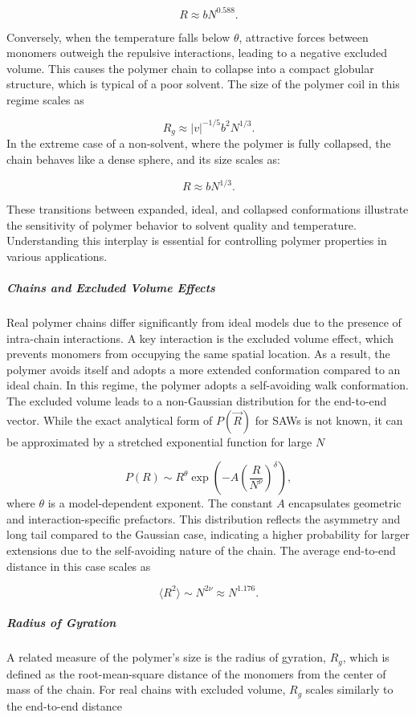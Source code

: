 \documentclass{article}      %
\begin{document}
\[
R \approx b N^{0.588}.
\]

Conversely, when the temperature falls below \( \theta \), attractive forces between monomers outweigh the repulsive interactions, leading to a negative excluded volume. This causes the polymer chain to collapse into a compact globular structure, which is typical of a poor solvent. The size of the polymer coil in this regime scales as

\[
R_g \approx |v|^{-1/5} b^2 N^{1/3}.
\]
In the extreme case of a non-solvent, where the polymer is fully collapsed, the chain behaves like a dense sphere, and its size scales as:

\[
R \approx b N^{1/3}.
\]

These transitions between expanded, ideal, and collapsed conformations illustrate the sensitivity of polymer behavior to solvent quality and temperature. Understanding this interplay is essential for controlling polymer properties in various applications.

\subparagraph{Chains and Excluded Volume Effects}
Real polymer chains differ significantly from ideal models due to the presence of intra-chain interactions. A key interaction is the excluded volume effect, which prevents monomers from occupying the same spatial location. As a result, the polymer avoids itself and adopts a more extended conformation compared to an ideal chain.
In this regime, the polymer adopts a self-avoiding walk conformation. The excluded volume leads to a non-Gaussian distribution for the end-to-end vector. While the exact analytical form of \( P(\vec{R}) \) for SAWs is not known, it can be approximated by a stretched exponential function for large \( N \)

\[
P(R) \sim R^{\theta} \exp\left( -A \left( \frac{R}{N^\nu} \right)^\delta \right),
\]
where \( \theta \) is a model-dependent exponent. The constant \( A \) encapsulates geometric and interaction-specific prefactors. This distribution reflects the asymmetry and long tail compared to the Gaussian case, indicating a higher probability for larger extensions due to the self-avoiding nature of the chain.
The average end-to-end distance in this case scales as

\[
\langle R^2 \rangle \sim N^{2\nu} \approx N^{1.176}.
\]

\subparagraph{Radius of Gyration}

A related measure of the polymer's size is the radius of gyration, \( R_g \), which is defined as the root-mean-square distance of the monomers from the center of mass of the chain. For real chains with excluded volume, \( R_g \) scales similarly to the end-to-end distance
\end{document}
